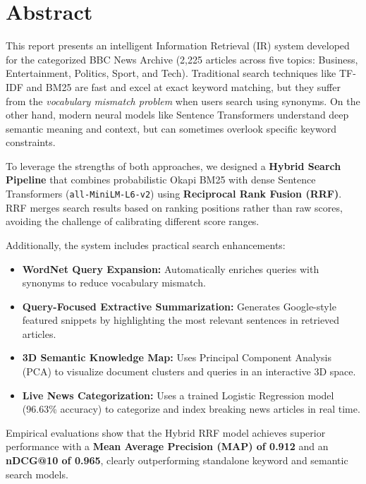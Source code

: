 \documentclass[11pt,a4paper]{article}
\begin{document}
\newpage

\section*{\centering Abstract}

This report presents an intelligent Information Retrieval (IR) system developed for the categorized BBC News Archive (2,225 articles across five topics: Business, Entertainment, Politics, Sport, and Tech). Traditional search techniques like TF-IDF and BM25 are fast and excel at exact keyword matching, but they suffer from the \textit{vocabulary mismatch problem} when users search using synonyms. On the other hand, modern neural models like Sentence Transformers understand deep semantic meaning and context, but can sometimes overlook specific keyword constraints.

To leverage the strengths of both approaches, we designed a \textbf{Hybrid Search Pipeline} that combines probabilistic Okapi BM25 with dense Sentence Transformers (\texttt{all-MiniLM-L6-v2}) using \textbf{Reciprocal Rank Fusion (RRF)}. RRF merges search results based on ranking positions rather than raw scores, avoiding the challenge of calibrating different score ranges.

Additionally, the system includes practical search enhancements:
\begin{itemize}[leftmargin=1.5em]
    \item \textbf{WordNet Query Expansion:} Automatically enriches queries with synonyms to reduce vocabulary mismatch.
    \item \textbf{Query-Focused Extractive Summarization:} Generates Google-style featured snippets by highlighting the most relevant sentences in retrieved articles.
    \item \textbf{3D Semantic Knowledge Map:} Uses Principal Component Analysis (PCA) to visualize document clusters and queries in an interactive 3D space.
    \item \textbf{Live News Categorization:} Uses a trained Logistic Regression model (96.63\% accuracy) to categorize and index breaking news articles in real time.
\end{itemize}

Empirical evaluations show that the Hybrid RRF model achieves superior performance with a \textbf{Mean Average Precision (MAP) of 0.912} and an \textbf{nDCG@10 of 0.965}, clearly outperforming standalone keyword and semantic search models.
\end{document}
